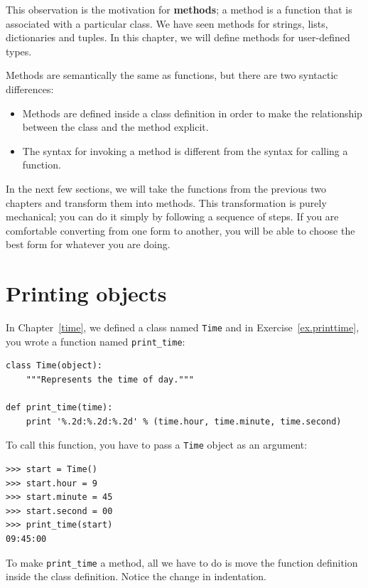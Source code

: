 \documentclass[10pt]{book}
\begin{document}
This observation is the motivation for {\bf methods}; a method is
a function that is associated with a particular class.
We have seen methods for strings, lists, dictionaries and tuples.
In this chapter, we will define methods for user-defined types.

Methods are semantically the same as functions, but there are
two syntactic differences:

\begin{itemize}

\item Methods are defined inside a class definition in order
to make the relationship between the class and the method explicit.

\item The syntax for invoking a method is different from the
syntax for calling a function.

\end{itemize}

In the next few sections, we will take the functions from the previous
two chapters and transform them into methods.  This transformation is
purely mechanical; you can do it simply by following a sequence of
steps.  If you are comfortable converting from one form to another,
you will be able to choose the best form for whatever you are doing.


\section{Printing objects}

In Chapter~\ref{time}, we defined a class named
{\tt Time} and in Exercise~\ref{ex.printtime}, you
wrote a function named \verb"print_time":

\begin{verbatim}
class Time(object):
    """Represents the time of day."""

def print_time(time):
    print '%.2d:%.2d:%.2d' % (time.hour, time.minute, time.second)
\end{verbatim}
%
To call this function, you have to pass a {\tt Time} object as an
argument:

\begin{verbatim}
>>> start = Time()
>>> start.hour = 9
>>> start.minute = 45
>>> start.second = 00
>>> print_time(start)
09:45:00
\end{verbatim}
%
To make \verb"print_time" a method, all we have to do is
move the function definition inside the class definition.  Notice
the change in indentation.
\end{document}
